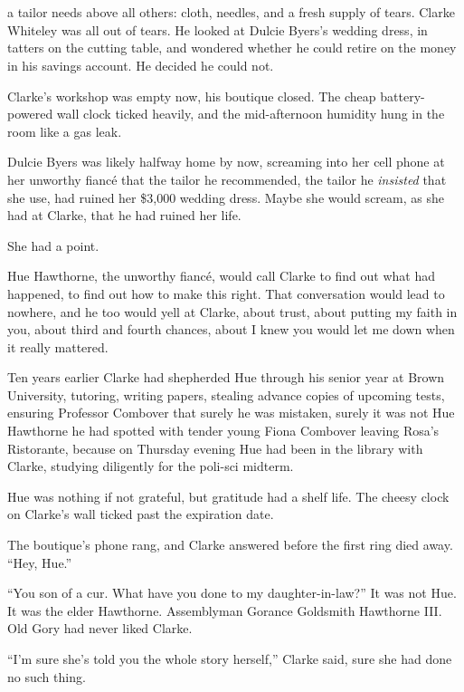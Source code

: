 \chapter{\previewtitle}
\useemptypageframe

 a tailor needs above all others: cloth, needles,
and a fresh supply of tears. Clarke Whiteley was all out of tears. He
looked at Dulcie Byers’s wedding dress, in tatters on the cutting table,
and wondered whether he could retire on the money in his savings
account. He decided he could not.

Clarke’s workshop was empty now, his boutique closed. The cheap
battery-powered wall clock ticked heavily, and the mid-afternoon
humidity hung in the room like a gas leak.

Dulcie Byers was likely halfway home by now, screaming into her cell
phone at her unworthy fiancé that the tailor he recommended, the tailor
he \emph{insisted} that she use, had ruined her \$3,000 wedding dress.
Maybe she would scream, as she had at Clarke, that he had ruined her
life.

She had a point.

Hue Hawthorne, the unworthy fiancé, would call Clarke to find out what
had happened, to find out how to make this right. That conversation
would lead to nowhere, and he too would yell at Clarke, about trust,
about putting my faith in you, about third and fourth chances, about I
knew you would let me down when it really mattered.

Ten years earlier Clarke had shepherded Hue through his senior year at
Brown University, tutoring, writing papers, stealing advance copies of
upcoming tests, ensuring Professor Combover that surely he was mistaken,
surely it was not Hue Hawthorne he had spotted with tender young Fiona
Combover leaving Rosa’s Ristorante, because on Thursday evening Hue had
been in the library with Clarke, studying diligently for the poli-sci
midterm.

Hue was nothing if not grateful, but gratitude had a shelf life. The
cheesy clock on Clarke’s wall ticked past the expiration date.

The boutique’s phone rang, and Clarke answered before the first ring
died away. “Hey, Hue.”

“You son of a cur. What have you done to my daughter-in-law?” It was not
Hue. It was the elder Hawthorne. Assemblyman Gorance Goldsmith Hawthorne
III. Old Gory had never liked Clarke.

“I’m sure she’s told you the whole story herself,” Clarke said, sure she
had done no such thing.


